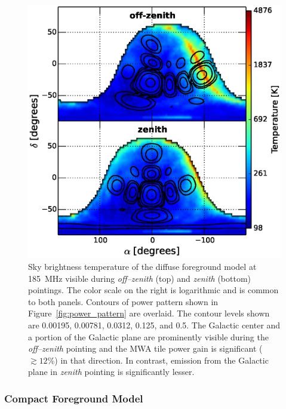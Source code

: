 \documentclass[preprint2,iop,numberedappendix]{emulateapj}
\begin{document}
\begin{figure}[htb]
\centering
\includegraphics[width=\linewidth]{fig5.eps}
\caption{Sky brightness temperature of the diffuse foreground model at 185~MHz visible during {\it off--zenith} (top) and {\it zenith} (bottom) pointings. The color scale on the right is logarithmic and is common to both panels. Contours of power pattern shown in Figure~\ref{fig:power_pattern} are overlaid. The contour levels shown are 0.00195, 0.00781, 0.0312, 0.125, and 0.5. The Galactic center and a portion of the Galactic plane are prominently visible during the {\it off--zenith} pointing and the MWA tile power gain is significant ($\gtrsim 12$\%) in that direction. In contrast, emission from the Galactic plane in {\it zenith} pointing is significantly lesser. \label{fig:DSM}}
\end{figure}

\subsubsection{Compact Foreground Model}\label{sec:CSM}
\end{document}
